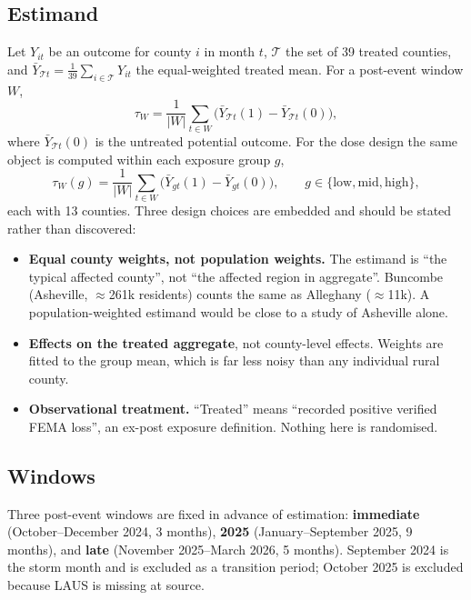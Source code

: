 \documentclass[11pt,a4paper]{article}
\newcommand{\Tr}{\mathcal{T}}
\begin{document}
\subsection{Estimand}
Let $Y_{it}$ be an outcome for county $i$ in month $t$, $\Tr$ the set of 39 treated counties, and
$\bar Y_{\Tr t}=\tfrac{1}{39}\sum_{i\in\Tr}Y_{it}$ the equal-weighted treated mean. For a post-event
window $W$,
\begin{equation}
\tau_W=\frac{1}{|W|}\sum_{t\in W}\Big(\bar Y_{\Tr t}(1)-\bar Y_{\Tr t}(0)\Big),
\end{equation}
where $\bar Y_{\Tr t}(0)$ is the untreated potential outcome. For the dose design the same object is
computed within each exposure group $g$,
\begin{equation}
\tau_W(g)=\frac{1}{|W|}\sum_{t\in W}\Big(\bar Y_{g t}(1)-\bar Y_{g t}(0)\Big),\qquad g\in\{\text{low},\text{mid},\text{high}\},
\end{equation}
each with 13 counties. Three design choices are embedded and should be stated rather than discovered:

\begin{itemize}[nosep,leftmargin=1.4em]
\item \textbf{Equal county weights, not population weights.} The estimand is ``the typical affected
county'', not ``the affected region in aggregate''. Buncombe (Asheville, $\approx$261k residents)
counts the same as Alleghany ($\approx$11k). A population-weighted estimand would be close to a study
of Asheville alone.
\item \textbf{Effects on the treated aggregate}, not county-level effects. Weights are fitted to the
group mean, which is far less noisy than any individual rural county.
\item \textbf{Observational treatment.} ``Treated'' means ``recorded positive verified FEMA loss'',
an ex-post exposure definition. Nothing here is randomised.
\end{itemize}

\subsection{Windows}
Three post-event windows are fixed in advance of estimation:
\textbf{immediate} (October--December 2024, 3 months), \textbf{2025} (January--September 2025, 9
months), and \textbf{late} (November 2025--March 2026, 5 months). September 2024 is the storm month
and is excluded as a transition period; October 2025 is excluded because LAUS is missing at source.
\end{document}

